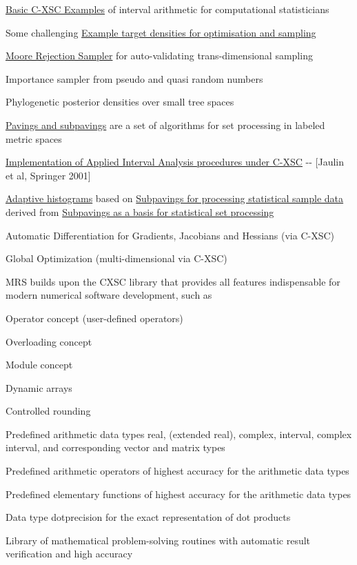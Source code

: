 \begin{DoxyItemize}
\item \hyperlink{cxscexamples}{\-Basic \-C-\/\-X\-S\-C \-Examples} of interval arithmetic for computational statisticians
\item \-Some challenging \hyperlink{target_examples}{\-Example target densities for optimisation and sampling}
\item \hyperlink{moorerejsam}{\-Moore \-Rejection \-Sampler} for auto-\/validating trans-\/dimensional sampling
\item \-Importance sampler from pseudo and quasi random numbers
\item \-Phylogenetic posterior densities over small tree spaces
\item \hyperlink{pavproc}{\-Pavings and subpavings} are a set of algorithms for set processing in labeled metric spaces
\item \hyperlink{AIASubPavings}{\-Implementation of \-Applied \-Interval \-Analysis procedures under \-C-\/\-X\-S\-C} -\/-\/ \mbox{[}\-Jaulin et al, \-Springer 2001\mbox{]}
\item \hyperlink{AdaptiveHistograms}{\-Adaptive histograms} based on \hyperlink{StatsSubPavings}{\-Subpavings for processing statistical sample data} derived from \hyperlink{newsubpavings}{\-Subpavings as a basis for statistical set processing}
\item \-Automatic \-Differentiation for \-Gradients, \-Jacobians and \-Hessians (via \-C-\/\-X\-S\-C)
\item \-Global \-Optimization (multi-\/dimensional via \-C-\/\-X\-S\-C)
\end{DoxyItemize}

\-M\-R\-S builds upon the \-C\-X\-S\-C library that provides all features indispensable for modern numerical software development, such as


\begin{DoxyItemize}
\item \-Operator concept (user-\/defined operators)
\item \-Overloading concept
\item \-Module concept
\item \-Dynamic arrays
\item \-Controlled rounding
\item \-Predefined arithmetic data types real, (extended real), complex, interval, complex interval, and corresponding vector and matrix types
\item \-Predefined arithmetic operators of highest accuracy for the arithmetic data types
\item \-Predefined elementary functions of highest accuracy for the arithmetic data types
\item \-Data type dotprecision for the exact representation of dot products
\item \-Library of mathematical problem-\/solving routines with automatic result verification and high accuracy
\end{DoxyItemize}



